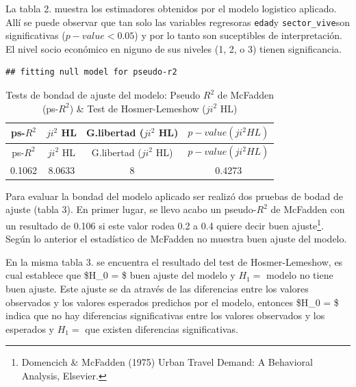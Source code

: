 \documentclass[
]{article}
\begin{document}
La tabla 2. muestra los estimadores obtenidos por el modelo logistico
aplicado. Allí se puede observar que tan solo las variables regresoras
\texttt{edad}y \texttt{sector\_vive}son significativas
(\(p - value < 0.05\)) y por lo tanto son suceptibles de interpretación.
El nivel socio económico en niguno de sus niveles (1, 2, o 3) tienen
significancia.

\begin{verbatim}
## fitting null model for pseudo-r2
\end{verbatim}

\begin{longtable}[]{@{}cccc@{}}
\caption{Tests de bondad de ajuste del modelo: Pseudo \(R^2\) de
McFadden (ps-\(R^2\)) \& Test de Hosmer-Lemeshow (\(ji^2\)
HL)}\tabularnewline
\toprule
ps-\(R^2\) & \(ji^2\) HL & G.libertad (\(ji^2\) HL) &
\(p-value(ji^2 HL)\)\tabularnewline
\midrule
\endfirsthead
\toprule
ps-\(R^2\) & \(ji^2\) HL & G.libertad (\(ji^2\) HL) &
\(p-value(ji^2 HL)\)\tabularnewline
\midrule
\endhead
0.1062 & 8.0633 & 8 & 0.4273\tabularnewline
\bottomrule
\end{longtable}

Para evaluar la bondad del modelo aplicado ser realizó dos pruebas de
bodad de ajuste (tabla 3). En primer lugar, se llevo acabo un
pseudo-\(R^2\) de McFadden con un resultado de 0.106 si este valor rodea
0.2 a 0.4 quiere decir buen ajuste\footnote{Domencich \& McFadden (1975)
  Urban Travel Demand: A Behavioral Analysis, Elsevier.}. Según lo
anterior el estadístico de McFadden no muestra buen ajuste del modelo.

En la misma tabla 3. se encuentra el resultado del test de
Hosmer-Lemeshow, es cual establece que \$H\_0 = \$ buen ajuste del
modelo y \(H_1 =\) modelo no tiene buen ajuste. Este ajuste se da
através de las diferencias entre los valores observados y los valores
esperados predichos por el modelo, entonces \$H\_0 = \$ indica que no
hay diferencias significativas entre los valores observados y los
esperados y \(H_1 =\) que existen diferencias significativas.
\end{document}
